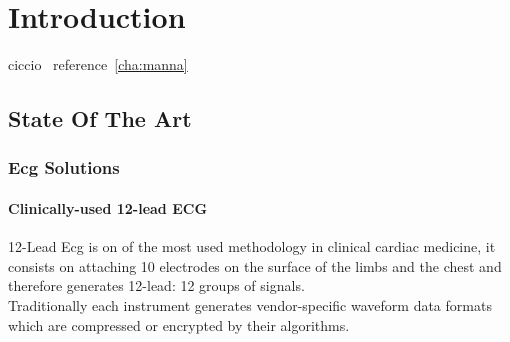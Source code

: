 

    

\chapter{Introduction}
ciccio~\label{cha:manna}
reference~\ref{cha:manna}

\section{State Of The Art}
\subsection{Ecg Solutions}
\subsubsection{Clinically-used 12-lead ECG}
12-Lead Ecg is on of the most used methodology in clinical cardiac medicine, it consists on attaching 10 electrodes on the surface of the limbs and the chest and therefore generates 12-lead: 12 groups of signals.\\
Traditionally each instrument generates vendor-specific waveform data formats which are compressed or encrypted by their algorithms.
